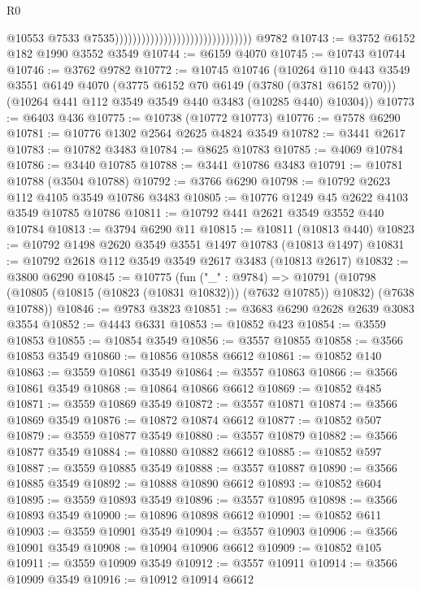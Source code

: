 \begin{lexlean}{R0}
\begin{coremodule}
                                                                  @10553
                                                                  @7533
                                                                  @7535)))))))))))))))))))))))))))))))
    @9782
@10743 := @3752 @6152 @182 @1990 @3552 @3549
@10744 := @6159 @4070
@10745 := @10743 @10744
@10746 := @3762 @9782
@10772 := @10745
    @10746
    (@10264
      @110
      @443
      @3549
      @3551
      @6149
      @4070
      (@3775 @6152 @70 @6149 (@3780 (@3781 @6152 @70)))
      (@10264 @441 @112 @3549 @3549 @440 @3483 (@10285 @440) @10304))
@10773 := @6403 @436
@10775 := @10738 (@10772 @10773)
@10776 := @7578 @6290
@10781 := @10776 @1302 @2564 @2625 @4824 @3549
@10782 := @3441 @2617
@10783 := @10782 @3483
@10784 := @8625 @10783
@10785 := @4069 @10784
@10786 := @3440 @10785
@10788 := @3441 @10786 @3483
@10791 := @10781 @10788 (@3504 @10788)
@10792 := @3766 @6290
@10798 := @10792 @2623 @112 @4105 @3549 @10786 @3483
@10805 := @10776 @1249 @45 @2622 @4103 @3549 @10785 @10786
@10811 := @10792 @441 @2621 @3549 @3552 @440 @10784
@10813 := @3794 @6290 @11
@10815 := @10811 (@10813 @440)
@10823 := @10792 @1498 @2620 @3549 @3551 @1497 @10783 (@10813 @1497)
@10831 := @10792 @2618 @112 @3549 @3549 @2617 @3483 (@10813 @2617)
@10832 := @3800 @6290
@10845 := @10775
    (fun ("_" : @9784) =>
    @10791 (@10798 (@10805 (@10815 (@10823 (@10831 @10832))) (@7632 @10785)) @10832) (@7638 @10788))
@10846 := @9783 @3823
@10851 := @3683 @6290 @2628 @2639 @3083 @3554
@10852 := @4443 @6331
@10853 := @10852 @423
@10854 := @3559 @10853
@10855 := @10854 @3549
@10856 := @3557 @10855
@10858 := @3566 @10853 @3549
@10860 := @10856 @10858 @6612
@10861 := @10852 @140
@10863 := @3559 @10861 @3549
@10864 := @3557 @10863
@10866 := @3566 @10861 @3549
@10868 := @10864 @10866 @6612
@10869 := @10852 @485
@10871 := @3559 @10869 @3549
@10872 := @3557 @10871
@10874 := @3566 @10869 @3549
@10876 := @10872 @10874 @6612
@10877 := @10852 @507
@10879 := @3559 @10877 @3549
@10880 := @3557 @10879
@10882 := @3566 @10877 @3549
@10884 := @10880 @10882 @6612
@10885 := @10852 @597
@10887 := @3559 @10885 @3549
@10888 := @3557 @10887
@10890 := @3566 @10885 @3549
@10892 := @10888 @10890 @6612
@10893 := @10852 @604
@10895 := @3559 @10893 @3549
@10896 := @3557 @10895
@10898 := @3566 @10893 @3549
@10900 := @10896 @10898 @6612
@10901 := @10852 @611
@10903 := @3559 @10901 @3549
@10904 := @3557 @10903
@10906 := @3566 @10901 @3549
@10908 := @10904 @10906 @6612
@10909 := @10852 @105
@10911 := @3559 @10909 @3549
@10912 := @3557 @10911
@10914 := @3566 @10909 @3549
@10916 := @10912 @10914 @6612

\end{coremodule}
\end{lexlean}
